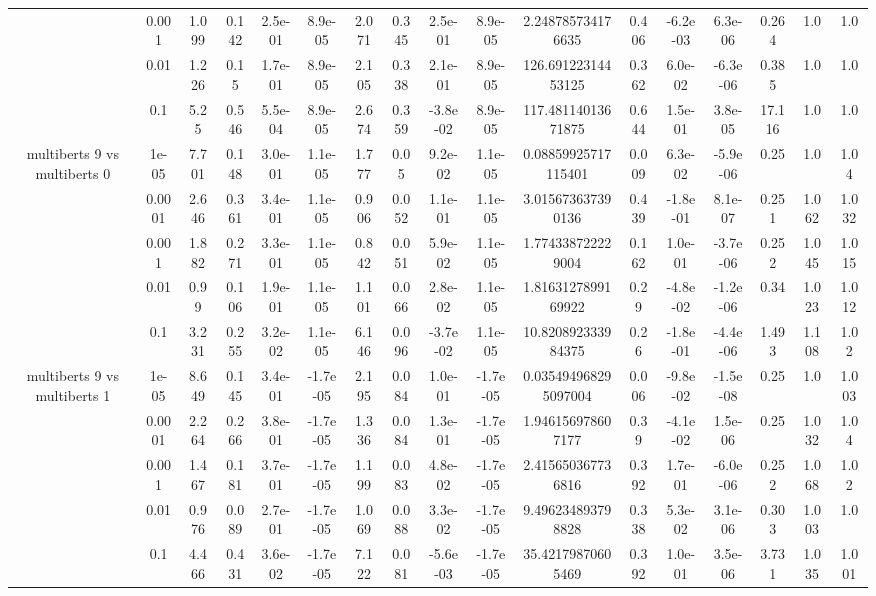 \begin{tabular}{|c|c|c|c|c|c|c|c|c|c|c|c|c|c|c|c|c|}
 & 0.001 & 1.099 & 0.142 & 2.5e-01 & 8.9e-05 & 2.071 & 0.345 & 2.5e-01 & 8.9e-05 & 2.248785734176635 & 0.406 & -6.2e-03 & 6.3e-06 & 0.264 & 1.0 & 1.0 \\
 & 0.01 & 1.226 & 0.15 & 1.7e-01 & 8.9e-05 & 2.105 & 0.338 & 2.1e-01 & 8.9e-05 & 126.69122314453125 & 0.362 & 6.0e-02 & -6.3e-06 & 0.385 & 1.0 & 1.0 \\
 & 0.1 & 5.25 & 0.546 & 5.5e-04 & 8.9e-05 & 2.674 & 0.359 & -3.8e-02 & 8.9e-05 & 117.48114013671875 & 0.644 & 1.5e-01 & 3.8e-05 & 17.116 & 1.0 & 1.0 \\
\hline
\multirow{5}{*}{multiberts 9 vs multiberts 0} & 1e-05 & 7.701 & 0.148 & 3.0e-01 & 1.1e-05 & 1.777 & 0.05 & 9.2e-02 & 1.1e-05 & 0.08859925717115401 & 0.009 & 6.3e-02 & -5.9e-06 & 0.25 & 1.0 & 1.04 \\
 & 0.0001 & 2.646 & 0.361 & 3.4e-01 & 1.1e-05 & 0.906 & 0.052 & 1.1e-01 & 1.1e-05 & 3.015673637390136 & 0.439 & -1.8e-01 & 8.1e-07 & 0.251 & 1.062 & 1.032 \\
 & 0.001 & 1.882 & 0.271 & 3.3e-01 & 1.1e-05 & 0.842 & 0.051 & 5.9e-02 & 1.1e-05 & 1.774338722229004 & 0.162 & 1.0e-01 & -3.7e-06 & 0.252 & 1.045 & 1.015 \\
 & 0.01 & 0.99 & 0.106 & 1.9e-01 & 1.1e-05 & 1.101 & 0.066 & 2.8e-02 & 1.1e-05 & 1.8163127899169922 & 0.29 & -4.8e-02 & -1.2e-06 & 0.34 & 1.023 & 1.012 \\
 & 0.1 & 3.231 & 0.255 & 3.2e-02 & 1.1e-05 & 6.146 & 0.096 & -3.7e-02 & 1.1e-05 & 10.820892333984375 & 0.26 & -1.8e-01 & -4.4e-06 & 1.493 & 1.108 & 1.02 \\
\hline
\multirow{5}{*}{multiberts 9 vs multiberts 1} & 1e-05 & 8.649 & 0.145 & 3.4e-01 & -1.7e-05 & 2.195 & 0.084 & 1.0e-01 & -1.7e-05 & 0.035494968295097004 & 0.006 & -9.8e-02 & -1.5e-08 & 0.25 & 1.0 & 1.003 \\
 & 0.0001 & 2.264 & 0.266 & 3.8e-01 & -1.7e-05 & 1.336 & 0.084 & 1.3e-01 & -1.7e-05 & 1.946156978607177 & 0.39 & -4.1e-02 & 1.5e-06 & 0.25 & 1.032 & 1.04 \\
 & 0.001 & 1.467 & 0.181 & 3.7e-01 & -1.7e-05 & 1.199 & 0.083 & 4.8e-02 & -1.7e-05 & 2.415650367736816 & 0.392 & 1.7e-01 & -6.0e-06 & 0.252 & 1.068 & 1.02 \\
 & 0.01 & 0.976 & 0.089 & 2.7e-01 & -1.7e-05 & 1.069 & 0.088 & 3.3e-02 & -1.7e-05 & 9.496234893798828 & 0.338 & 5.3e-02 & 3.1e-06 & 0.303 & 1.003 & 1.0 \\
 & 0.1 & 4.466 & 0.431 & 3.6e-02 & -1.7e-05 & 7.122 & 0.081 & -5.6e-03 & -1.7e-05 & 35.42179870605469 & 0.392 & 1.0e-01 & 3.5e-06 & 3.731 & 1.035 & 1.001 \\

\end{tabular}
